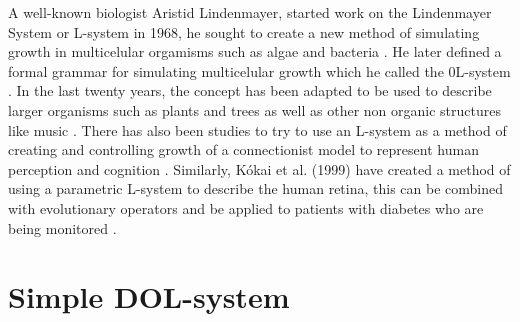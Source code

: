 \begin{flushleft}
A well-known biologist Aristid Lindenmayer, started work on the Lindenmayer System or L-system in 1968, he sought to create a new method of simulating growth in multicelular orgamisms such as algae and bacteria \cite{lindenmayer1968mathematical}. He later defined a formal grammar for simulating multicelular growth which he called the 0L-system \cite {lindenmayer1971developmental}. In the last twenty years, the concept has been adapted to be used to describe larger organisms such as plants and trees as well as other non organic structures like music \cite{worth2005growing}. There has also been studies to try to use an L-system as a method of creating and controlling growth of a connectionist model to represent human perception and cognition \cite{vaario1991connectionist}. Similarly, K{\'o}kai et al. (1999) have created a method of using a parametric L-system to describe the human retina, this can be combined with evolutionary operators and be applied to patients with diabetes who are being monitored \cite{kokai1999parametric}.

\end{flushleft}

\section{Simple DOL-system} \label{Simple DOL-systems}


